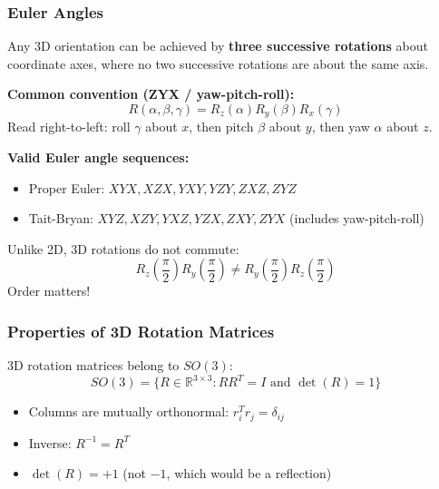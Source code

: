 \separator

\subsubsection{Euler Angles}

\begin{defbox}
Any 3D orientation can be achieved by \textbf{three successive rotations} about coordinate axes, where no two successive rotations are about the same axis.

\textbf{Common convention (ZYX / yaw-pitch-roll):}
\[
R(\alpha, \beta, \gamma) = R_z(\alpha) R_y(\beta) R_x(\gamma)
\]
Read right-to-left: roll $\gamma$ about $x$, then pitch $\beta$ about $y$, then yaw $\alpha$ about $z$.
\end{defbox}

\textbf{Valid Euler angle sequences:}
\begin{itemize}
  \item Proper Euler: $XYX, XZX, YXY, YZY, ZXZ, ZYZ$
  \item Tait-Bryan: $XYZ, XZY, YXZ, YZX, ZXY, ZYX$ (includes yaw-pitch-roll)
\end{itemize}

\begin{tipbox}
Unlike 2D, 3D rotations do not commute:
\[
R_z\left(\frac{\pi}{2}\right) R_y\left(\frac{\pi}{2}\right) \neq R_y\left(\frac{\pi}{2}\right) R_z\left(\frac{\pi}{2}\right)
\]
Order matters!
\end{tipbox}

\separator

\subsubsection{Properties of 3D Rotation Matrices}

\begin{thmbox}
3D rotation matrices belong to $SO(3)$:
\[
SO(3) = \{R \in \mathbb{R}^{3\times 3} : R R^T = I \text{ and } \det(R) = 1\}
\]
\begin{itemize}
  \item Columns are mutually orthonormal: $r_i^T r_j = \delta_{ij}$
  \item Inverse: $R^{-1} = R^T$
  \item $\det(R) = +1$ (not $-1$, which would be a reflection)
\end{itemize}
\end{thmbox}

